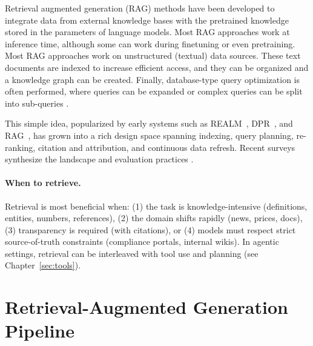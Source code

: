 Retrieval augmented generation (RAG) methods have been developed to integrate data from external knowledge bases with the pretrained  knowledge stored in the parameters of language models.
Most RAG approaches work at inference time, although some can work during finetuning or even pretraining.
Most RAG approaches work on unstructured (textual) data sources. These text documents are indexed to increase efficient access, and they can be organized and a knowledge graph can be created. Finally, database-type query optimization is often
performed, where queries can be expanded or complex queries can be
split into sub-queries \citep{cong2024query}.

This simple idea, popularized by early systems such as REALM~\citep{guu2020realm}, DPR~\citep{karpukhin2020dense}, and RAG~\citep{lewis2020retrieval}, has grown into a rich design space spanning indexing, query planning, re-ranking, citation and attribution, and continuous data refresh. Recent surveys synthesize the landscape and evaluation practices \citep{gao2023rag_survey,huang2024rag_survey,yu2024rag_eval,sharma2025rag_survey,peng2024graphrag_survey}.




\paragraph{When to retrieve.} Retrieval is most beneficial when: (1) the task is knowledge-intensive (definitions, entities, numbers, references), (2) the domain shifts rapidly (news, prices, docs), (3) transparency is required (with citations), or (4) models must respect strict source-of-truth constraints (compliance portals, internal wikis). In agentic settings, retrieval can be interleaved with tool use and planning (see Chapter~\ref{sec:tools}).

\section{Retrieval-Augmented Generation Pipeline}
\label{sec:rag-pipeline}

